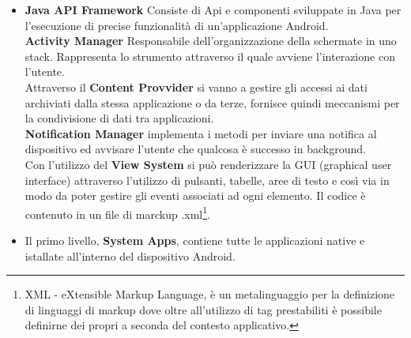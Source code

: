 \begin{itemize}
\item \textbf{Java API Framework} Consiste di Api e componenti sviluppate in Java per l'esecuzione di precise funzionalità di un'applicazione Android. 
\\\textbf{Activity Manager} Responsabile dell'organizzazione della schermate in uno stack. Rappresenta lo strumento attraverso il quale avviene l'interazione con l'utente. 
\\Attraverso il \textbf{{Content Provvider}} si vanno a gestire gli accessi ai dati archiviati dalla stessa applicazione o da terze, fornisce quindi meccanismi per la condivisione di dati tra applicazioni. 
\\\textbf{Notification Manager} implementa i metodi per inviare una notifica al dispositivo ed avvisare l'utente che qualcosa è successo in background. 
\\Con l'utilizzo del \textbf{View System} si può renderizzare la GUI (graphical user interface) attraverso l'utilizzo di pulsanti, tabelle, aree di testo e così via in modo da poter gestire gli eventi associati ad ogni elemento. Il codice è contenuto in un file di marckup .xml\footnote{XML - eXtensible Markup Language, è un metalinguaggio per la definizione di linguaggi di markup dove oltre all'utilizzo di tag prestabiliti è possibile definirne dei propri a seconda del contesto applicativo.}.
\item Il primo livello, \textbf{System Apps}, contiene tutte le applicazioni native e istallate all'interno del dispositivo Android. 
\end{itemize}



